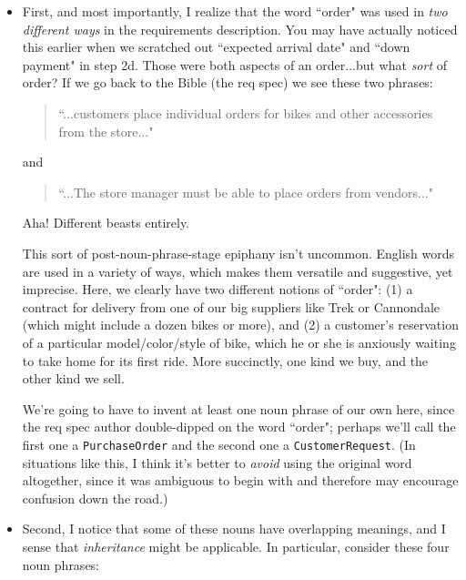 \begin{itemize}
\itemsep.1em

\item First, and most importantly, I realize that the word ``order" was used
in \textit{two different ways} in the requirements description. You may have
actually noticed this earlier when we scratched out ``expected arrival date"
and ``down payment" in step 2d. Those were both aspects of an order...but what
\textit{sort} of order? If we go back to the Bible (the req spec) we see these
two phrases:

\begin{quote}
\textsf{``...customers place individual orders for bikes and other accessories
from the store..."}
\end{quote}

\vspace{-.3in}
\begin{center}
and
\end{center}
\vspace{-.2in}

\begin{quote}
\textsf{``...The store manager must be able to place orders from vendors..."}
\end{quote}

Aha! Different beasts entirely.

This sort of post-noun-phrase-stage epiphany isn't uncommon. English words are
used in a variety of ways, which makes them versatile and suggestive, yet
imprecise. Here, we clearly have two different notions of ``order": (1) a
contract for delivery from one of our big suppliers like Trek or Cannondale
(which might include a dozen bikes or more), and (2) a customer's reservation
of a particular model/color/style of bike, which he or she is anxiously
waiting to take home for its first ride. More succinctly, one kind we buy, and
the other kind we sell.

We're going to have to invent at least one noun phrase of our own here, since
the req spec author double-dipped on the word ``order"; perhaps we'll call the
first one a \texttt{PurchaseOrder} and the second one a
\texttt{CustomerRequest}. (In situations like this, I think it's better to
\textit{avoid} using the original word altogether, since it was ambiguous to
begin with and therefore may encourage confusion down the road.)

\item Second, I notice that some of these nouns have overlapping meanings, and
I sense that \textit{inheritance} might be applicable. In particular, consider
these four noun phrases:


\end{itemize}
